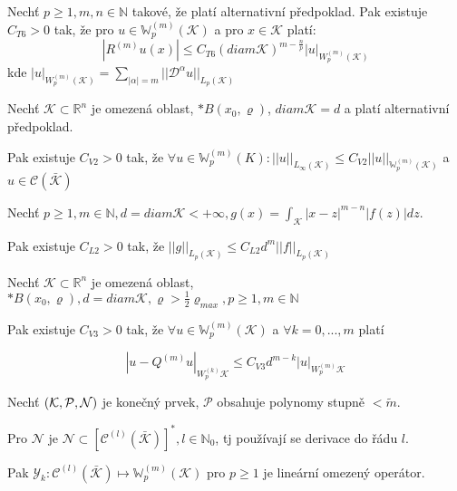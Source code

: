 \documentclass[../main.tex]{subfiles}
\begin{document}
\begin{claim}[T6]
    Nechť $p\geq1, m,n\in\mathbb{N}$ takové, že platí alternativní předpoklad. Pak existuje $C_{T6} > 0$ tak, že pro 
    $u\in \mathbb{W}_p^{(m)}(\mathcal{K})$ a pro $x\in\mathcal{K}$ platí:
    \begin{equation*}
        \left| R^{(m)} u(x) \right| \leq C_{T6} (diam \mathcal{K})^{m-\frac{n}{p}} |u|_{W_p^{(m)}(\mathcal{K})}
    \end{equation*}
    kde $|u|_{W^{(m)}_p (\mathcal{K})} = \sum_{|\alpha| =  m} ||\mathcal{D}^\alpha u || _{L_p (\mathcal{K})}$
\end{claim}


\begin{theorem}
    Nechť $\mathcal{K} \subset \mathbb{R}^n$ je omezená oblast, $*B(x_0, \varrho)$, $diam \mathcal{K} = d$ a platí alternativní předpoklad.

    Pak existuje $C_{V2} > 0$ tak, že $\forall u \in \mathbb{W}_p^{(m)} (K) : ||u||_{L_\infty(\mathcal{K})} \leq C_{V2} ||u||_{\mathbb{W}_p^{(m)}(\mathcal{K})} $ a $u\in\mathcal{C}(\bar{\mathcal{K}})$
    
\end{theorem}



\begin{lemma}
    Nechť $p\geq 1, m\in\mathbb{N}, d = diam \mathcal{K} < +\infty, g(x) = \int_\mathcal{K} |x-z|^{m-n} |f(z)| dz$.\

    Pak existuje $C_{L2} > 0$ tak, že $||g||_{L_p(\mathcal{K})} \leq C_{L2} d^m ||f||_{L_p(\mathcal{K})}$
\end{lemma}


\begin{theorem}
    Nechť $\mathcal{K}\subset\mathbb{R}^n$ je omezená oblast, $*B(x_0,\varrho), d=diam\mathcal{K}, \varrho > \frac{1}{2} \varrho_{max}, p\geq 1, m\in \mathbb{N} $
    
    Pak existuje $C_{V3} > 0$ tak, že $\forall u \in \mathbb{W}_p^{(m)}(\mathcal{K})$ a $\forall k = 0,...,m$ platí

    \begin{equation*}
        \left|  u-Q^{(m)}u     \right|_{W_p^{(k)}\mathcal{K}} \leq C_{V3} d^{m-k} |u|_{W_p^{(m)}\mathcal{K}} 
    \end{equation*}


\end{theorem}


\begin{lemma}[L3]
    Nechť $(\mathcal{K}, \mathcal{P}, \mathcal{N})$ je konečný prvek, $\mathcal{P}$ obsahuje polynomy stupně  $< \tilde{m}$.

    Pro $\mathcal{N}$ je $\mathcal{N}\subset \left[ \mathcal{C}^{(l)} (\bar{\mathcal{K}})  \right]^*, l\in \mathbb{N}_0$, tj používají se derivace do řádu $l$.


    Pak $\mathcal{Y}_k : \mathcal{C}^{(l)}(\bar{\mathcal{K}}) \mapsto \mathbb{W}_p^{(m)}(\mathcal{K})$ pro $p\geq1$ je lineární omezený operátor. 
\end{lemma}
\end{document}
